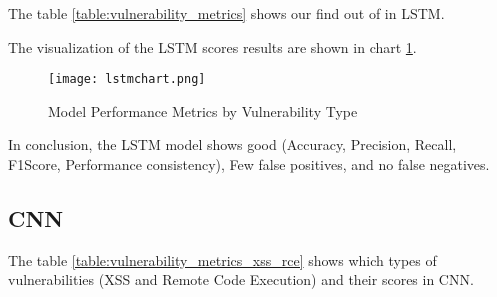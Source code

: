 The table \ref{table:vulnerability_metrics} shows our find out of in LSTM.
\begin{table}[H]
 \centering
 \caption{Vulnerability Statistics and Model Performance Metrics}
 \label{table:vulnerability_metrics}
 \end{table}
 The visualization of the LSTM scores results are shown in chart \ref{fig:model_performance_metrics}.
 \begin{figure}[H]
 \centering
 \texttt{[image: lstmchart.png]}
 \caption{Model Performance Metrics by Vulnerability Type}
 \label{fig:model_performance_metrics}
 \end{figure}
In conclusion, the LSTM model shows good (Accuracy, Precision, Recall, F1Score, Performance consistency), Few false positives, and no false negatives.

\subsection{CNN}
The table \ref{table:vulnerability_metrics_xss_rce} shows which types of vulnerabilities (XSS and Remote Code Execution) and their scores in CNN.

\begin{table}[H]
 \centering
 \caption{Vulnerability Statistics and Model Performance Metrics for XSS and Remote Code Execution}
 \label{table:vulnerability_metrics_xss_rce}
 \end{table}

